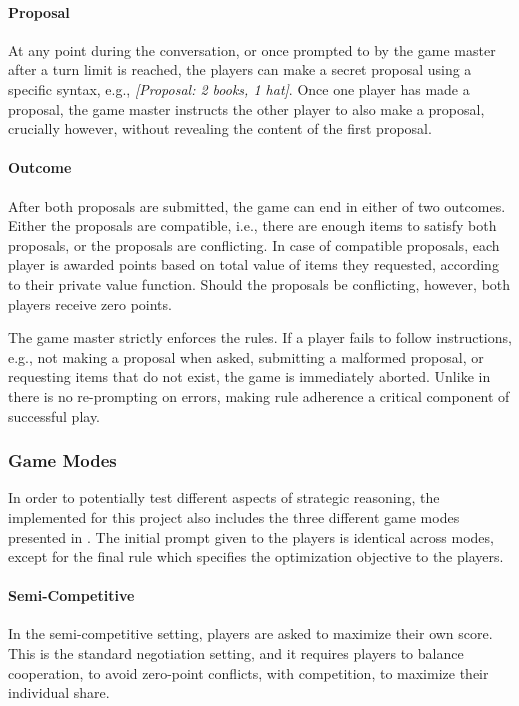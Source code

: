 \paragraph{Proposal}
At any point during the conversation, or once prompted to by the game master after a turn limit is reached, the players can make a secret proposal using a specific syntax, e.g., \textit{[Proposal: 2 books, 1 hat]}. Once one player has made a proposal, the game master instructs the other player to also make a proposal, crucially however, without revealing the content of the first proposal.

\paragraph{Outcome}
After both proposals are submitted, the game can end in either of two outcomes. Either the proposals are compatible, i.e., there are enough items to satisfy both proposals, or the proposals are conflicting. In case of compatible proposals, each player is awarded points based on total value of items they requested, according to their private value function. Should the proposals be conflicting, however, both players receive zero points.

The game master strictly enforces the rules. If a player fails to follow instructions, e.g., not making a proposal when asked, submitting a malformed proposal, or requesting items that do not exist, the game is immediately aborted. Unlike in \cite{liao2024efficacy} there is no re-prompting on errors, making rule adherence a critical component of successful play.



\subsubsection{Game Modes}

In order to potentially test different aspects of strategic reasoning, the  implemented for this project also includes the three different game modes presented in \cite{liao2024efficacy}. The initial prompt given to the players is identical across modes, except for the final rule which specifies the optimization objective to the players.

\paragraph{Semi-Competitive}
In the semi-competitive setting, players are asked to maximize their own score. This is the standard negotiation setting, and it requires players to balance cooperation, to avoid zero-point conflicts, with competition, to maximize their individual share.


